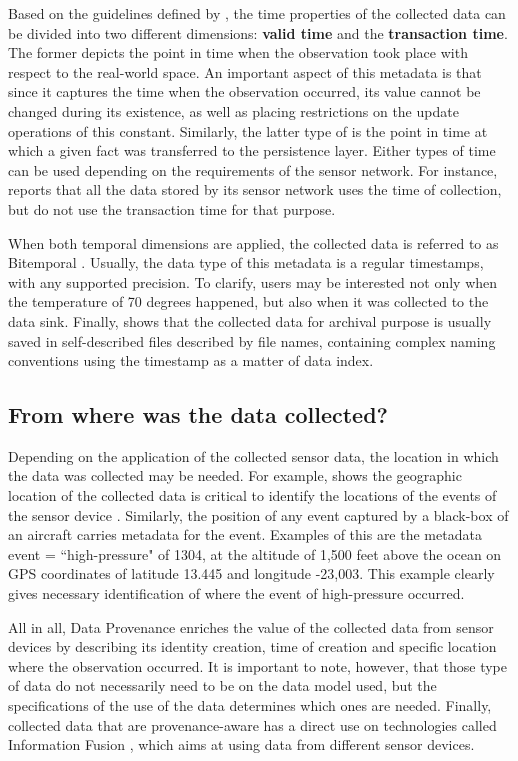 Based on the guidelines defined by \cite{db-temporal}, the time properties of
the collected data can be divided into two different dimensions: \textbf{valid
time} and the \textbf{transaction time}. The former depicts the point in time
when the observation took place with respect to the real-world space. An
important aspect of this metadata is that since it captures the time when the
observation occurred, its value cannot be changed during its existence, as well
as placing restrictions on the update operations of this constant. Similarly,
the latter type of is the point in time at which a given fact was transferred
to the persistence layer. Either types of time can be used depending on the
requirements of the sensor network. For instance, \cite{sn-dataware-house}
reports that all the data stored by its sensor network uses the time of
collection, but do not use the transaction time for that purpose.

When both temporal dimensions are applied, the collected data is referred to as
Bitemporal \cite{db-temporal}. Usually, the data type of this metadata is a
regular timestamps, with any supported precision. To clarify, users may be
interested not only when the temperature of 70 degrees happened, but also when
it was collected to the data sink. Finally, \cite{sn-provenance} shows that
the collected data for archival purpose is usually saved in self-described
files described by file names, containing complex naming conventions using the 
timestamp as a matter of data index.

\subsection{From where was the data collected?}

Depending on the application of the collected sensor data, the location in
which the data was collected may be needed. For example, \cite{sn-geo-metadata}
shows the geographic location of the collected data is critical to identify
the locations of the events of the sensor device \cite{sn-ex02}. Similarly,
the position of any event captured by a black-box of an aircraft carries 
metadata for the event. Examples of this are the metadata event =
``high-pressure" of 1304, at the altitude of 1,500 feet above the ocean on GPS
coordinates of latitude 13.445 and longitude -23,003. This example clearly
gives necessary identification of where the event of high-pressure occurred.

All in all, Data Provenance enriches the value of the collected data from
sensor devices by describing its identity creation, time of creation and
specific location where the observation occurred. It is important to note,
however, that those type of data do not necessarily need to be on the data
model used, but the specifications of the use of the data determines which
ones are needed. Finally, collected data that are provenance-aware has a direct
use on technologies called Information Fusion \cite{sn-info-fusion}, which aims
at using data from different sensor devices.

